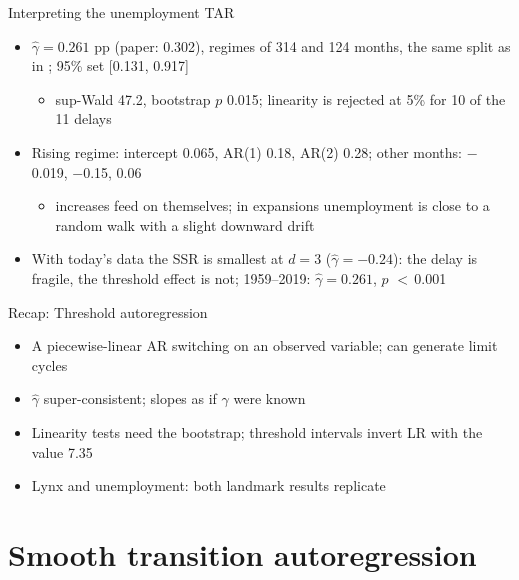 \begin{frame}{Interpreting the unemployment TAR}
\itemsize{\footnotesize}
\begin{itemize}
    \item $\hat\gamma = 0.261$ pp (paper: 0.302), regimes of 314 and 124 months, the same split as in ; 95\% set [0.131, 0.917]
    \begin{itemize}
        \item sup-Wald 47.2, bootstrap $p$ 0.015; linearity is rejected at 5\% for 10 of the 11 delays
    \end{itemize}
    \item Rising regime: intercept 0.065, AR(1) 0.18, AR(2) 0.28; other months: \ensuremath{-}0.019, \ensuremath{-}0.15, 0.06
    \begin{itemize}
        \item increases feed on themselves; in expansions unemployment is close to a random walk with a slight downward drift
    \end{itemize}
    \item With today's data the SSR is smallest at $d = 3$ ($\hat\gamma = \ensuremath{-}0.24$): the delay is fragile, the threshold effect is not; 1959--2019: $\hat\gamma = 0.261$, $p$ $<$\,0.001
\end{itemize}
\end{frame}

\begin{frame}{Recap: Threshold autoregression}
\itemsize{\small}
\begin{itemize}
    \item A piecewise-linear AR switching on an observed variable; can generate limit cycles
    \item $\hat\gamma$ super-consistent; slopes as if $\gamma$ were known
    \item Linearity tests need the bootstrap; threshold intervals invert LR with the value 7.35
    \item Lynx and unemployment: both landmark results replicate
\end{itemize}
\end{frame}


\section{Smooth transition autoregression}

